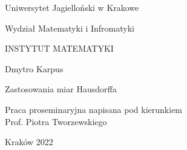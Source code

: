 \titleformat{\chapter}[display] {\normalfont\Huge\bfseries}{\chaptertitlename\ \thechapter}{0pt}{\Huge}
\titlespacing{\chapter}{1cm}{2cm}{1cm}

\thispagestyle{empty}
\begin{center}{\sc \large
Uniwersytet Jagielloński w Krakowe\par\vspace{0.2cm}\par
Wydział Matematyki i Infromatyki}\par\vspace{0.3cm}\par
{\large
INSTYTUT MATEMATYKI}\par\vspace{1cm}\par
\end{center}
\vspace{1.5cm}
\begin{flushleft}
\end{flushleft}
\vspace{1.5cm}
\begin{center}
{\LARGE
Dmytro Karpus%
}\par\vspace{0.9cm}\par
{\huge
Zastosowania miar Hausdorffa%
}
\end{center}
\vspace{4cm}
\begin{flushright}

Praca proseminaryjna napisana pod kierunkiem\\
Prof. Piotra Tworzewskiego%
\end{flushright}
\vfill
\begin{center}
{\Large Kraków 2022}%
\end{center}
